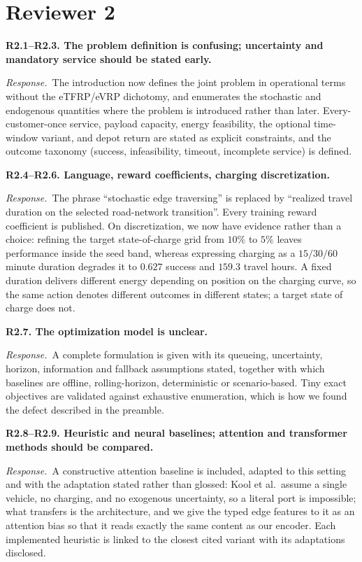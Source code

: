 \documentclass[11pt]{article}
\newcommand{\comment}[1]{\medskip\noindent\textbf{#1}\par\nopagebreak\smallskip}
\newcommand{\reply}{\noindent\textit{Response.}\ }
\begin{document}
\section*{Reviewer 2}

\comment{R2.1--R2.3. The problem definition is confusing; uncertainty and
mandatory service should be stated early.}
\reply The introduction now defines the joint problem in operational terms
without the eTFRP/eVRP dichotomy, and enumerates the stochastic and endogenous
quantities where the problem is introduced rather than later. Every-customer-once
service, payload capacity, energy feasibility, the optional time-window variant,
and depot return are stated as explicit constraints, and the outcome taxonomy
(success, infeasibility, timeout, incomplete service) is defined.

\comment{R2.4--R2.6. Language, reward coefficients, charging discretization.}
\reply The phrase ``stochastic edge traversing'' is replaced by ``realized
travel duration on the selected road-network transition''. Every training reward
coefficient is published. On discretization, we now have evidence rather than a
choice: refining the target state-of-charge grid from $10\%$ to $5\%$ leaves
performance inside the seed band, whereas expressing charging as a $15/30/60$
minute duration degrades it to $0.627$ success and $159.3$ travel hours. A fixed
duration delivers different energy depending on position on the charging curve,
so the same action denotes different outcomes in different states; a target
state of charge does not.

\comment{R2.7. The optimization model is unclear.}
\reply A complete formulation is given with its queueing, uncertainty, horizon,
information and fallback assumptions stated, together with which baselines are
offline, rolling-horizon, deterministic or scenario-based. Tiny exact objectives
are validated against exhaustive enumeration, which is how we found the defect
described in the preamble.

\comment{R2.8--R2.9. Heuristic and neural baselines; attention and transformer
methods should be compared.}
\reply A constructive attention baseline is included, adapted to this setting
and with the adaptation stated rather than glossed: Kool et al.\ assume a single
vehicle, no charging, and no exogenous uncertainty, so a literal port is
impossible; what transfers is the architecture, and we give the typed edge
features to it as an attention bias so that it reads exactly the same content as
our encoder. Each implemented heuristic is linked to the closest cited variant
with its adaptations disclosed.
\end{document}
